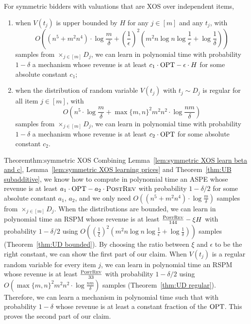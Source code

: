 \begin{theorem}\label{thm:symmetric XOS}
	For symmetric bidders with valuations that are XOS over independent items, \begin{enumerate}
		\item when $V(t_j)$ is upper bounded by $H$ for any $j\in[m]$ and any $t_j$, with $$O\left(\left(n^5+m^2n^4\right)\cdot\log\frac{m}{\delta}+\left(\frac{1}{\epsilon}\right)^2 \left(m^2 n\log n\log \frac{1}{\epsilon} + \log \frac{1}{\delta}\right)\right)$$ samples from $\times_{j\in[m]} D_j$, we can learn in polynomial time with probability $1-\delta$ a mechanism whose revenue is at least $c_1\cdot \text{OPT}-\epsilon\cdot H$ for some absolute constant $c_1$;
		\item when the distribution of random variable $V(t_j)$ with $t_j\sim D_j$ is regular for all item $j\in[m]$, with %
		$$O\left(n^5\cdot\log\frac{m}{\delta}+\max\{m,n\}^2m^2 n^2\cdot  \log \frac{nm}{\delta}\right)$$ samples from $\times_{j\in[m]} D_j$, we can learn in polynomial time with probability $1-\delta$ a mechanism whose revenue is at least $c_2\cdot \text{OPT}$ for some absolute constant $c_2$.
	\end{enumerate}
\end{theorem}
\begin{prevproof}{Theorem}{thm:symmetric XOS}
Combining Lemma~\ref{lem:symmetric XOS learn beta and c}, Lemma~\ref{lem:symmetric XOS learning prices} and Theorem~\ref{thm:UB subadditive}, we know how to compute in polynomial time an ASPE whose revenue is at least $a_1\cdot \text{OPT}-a_2\cdot\textsc{PostRev}$ with probability $1-\delta/2$ for some absolute constant $a_1$, $a_2$, and we only need $O\left(\left(n^5+m^2n^4\right)\cdot\log\frac{m}{\delta}\right)$ samples from $\times_{j\in[m]} D_j$. When the distributions are bounded, we can learn in polynomial time  an RSPM whose revenue is at least $\frac{\textsc{PostRev}}{144}-\xi H$ with probability $1-\delta/2$ using $O\left(\left(\frac{1}{\xi}\right)^2 \left(m^2 n\log n\log \frac{1}{\epsilon} + \log \frac{1}{\delta}\right)\right)$ samples (Theorem~\ref{thm:UD bounded}). By choosing the ratio between $\xi$ and $\epsilon$ to be the right constant, we can show the first part of our claim. When $V(t_j)$ is a regular random variable for every item $j$, we can learn in polynomial time  an RSPM whose revenue is at least $\frac{\textsc{PostRev}}{33}$ with probability $1-\delta/2$ using  $O\left(\max\{m,n\}^2m^2 n^2\cdot \log \frac{nm}{\delta}\right)$ samples (Theorem~\ref{thm:UD regular}). Therefore, we can learn a mechanism in polynomial time such that with probability $1-\delta$ whose revenue is at least a constant fraction of the $\text{OPT}$. This proves the second part of our claim.\end{prevproof}


